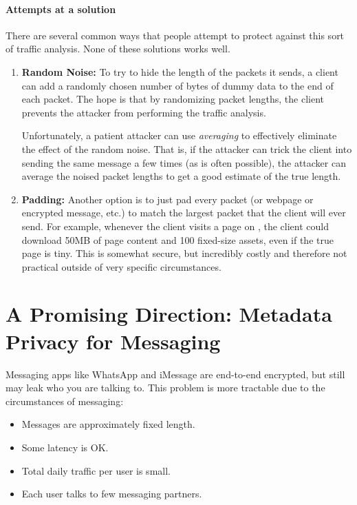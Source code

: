 \paragraph{Attempts at a solution}
There are several common ways that people attempt
to protect against this sort of traffic analysis.
None of these solutions works well. 

\begin{enumerate}
  \item \textbf{Random Noise:} 
    To try to hide the length of the packets it sends,
    a client can add a randomly chosen number of bytes
    of dummy data to the end of each packet.
    The hope is that by randomizing packet lengths, the
    client prevents the attacker from performing the
    traffic analysis.

    Unfortunately, a patient attacker can use \emph{averaging}
    to effectively eliminate the effect of the random noise.
    That is, if the attacker can trick the client into sending
    the same message a few times (as is often possible), the
    attacker can average the noised packet lengths to get a good estimate
    of the true length.

\item \textbf{Padding:}
  Another option is to just pad every packet (or
  webpage or encrypted message, etc.) to match the
  largest packet that the client will ever send.
  For example, whenever the client visits a page on
  , the client could
  download 50MB of page content and 100 fixed-size assets, even
  if the true page is tiny.
  This is somewhat secure, but
  incredibly costly and therefore not practical
  outside of very specific circumstances.
\end{enumerate}

\section{A Promising Direction: Metadata Privacy for Messaging}
Messaging apps like WhatsApp and iMessage are end-to-end encrypted, but still may leak who you are talking to. This problem is more tractable due to the circumstances of messaging:

\begin{itemize}
	\item Messages are approximately fixed length.
	\item Some latency is OK.
	\item Total daily traffic per user is small.
	\item Each user talks to few messaging partners.
\end{itemize}

